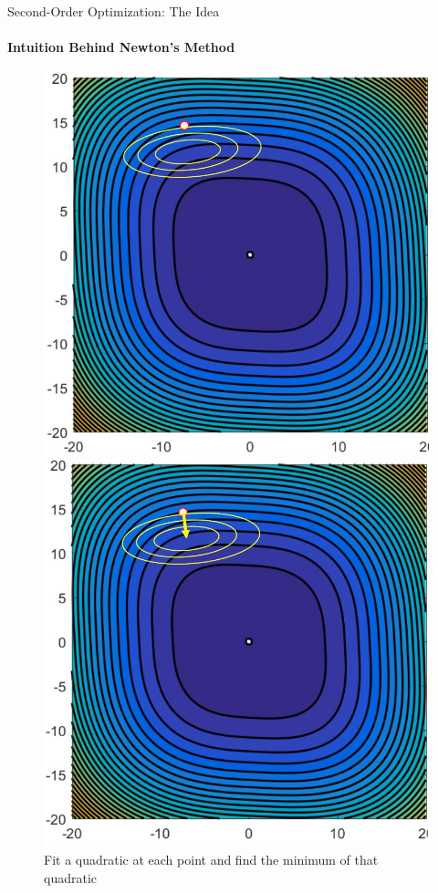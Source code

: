 \begin{frame}{Second-Order Optimization: The Idea}
    \framesubtitle{Intuition Behind Newton's Method}
    \begin{figure}
        \centering
        \begin{minipage}{.5\textwidth}
            \centering
            \includegraphics[width=\textwidth]{images/intuition_newton1.jpeg}
        \end{minipage}%
            \begin{minipage}{.5\textwidth}
            \centering
            \includegraphics[width=\textwidth]{images/intuition_newton2.jpeg}
        \end{minipage}
    \caption{Fit a quadratic at each point and find the minimum of that quadratic}
    \end{figure}
\end{frame}

